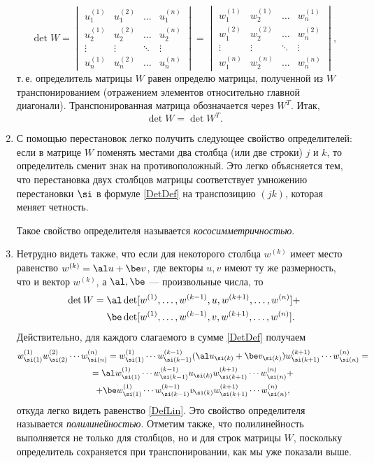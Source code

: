 \begin{enumerate}
$$\det W =
\begin{vmatrix}
u^{(1)}_1 & u^{(2)}_1 & \dots & u^{(n)}_1 \\[12pt]
u^{(1)}_2 & u^{(2)}_2 & \dots & u^{(n)}_2 \\[12pt]
\vdots & \vdots & \ddots & \vdots \\[12pt]
u^{(1)}_n & u^{(2)}_n & \dots & u^{(n)}_n
\end{vmatrix} =
\begin{vmatrix}
w^{(1)}_1 & w^{(1)}_2 & \dots & w^{(1)}_n \\[12pt]
w^{(2)}_1 & w^{(2)}_2 & \dots & w^{(2)}_n \\[12pt]
\vdots & \vdots & \ddots & \vdots \\[12pt]
w^{(n)}_1 & w^{(n)}_2 & \dots & w^{(n)}_n
\end{vmatrix},
$$
т.\,е. определитель матрицы $W$ равен определю матрицы, полученной из $W$ транспонированием (отражением элементов относительно главной диагонали). Транспонированная матрица обозначается через $W^T$. Итак,
$$
\det W=\det W^T.
$$

\item С помощью перестановок легко получить следующее свойство определителей: если в матрице $W$ поменять местами два столбца (или две строки) $j$ и $k$, то определитель сменит знак на противоположный. Это легко объясняется тем, что перестановка двух столбцов матрицы соответствует умножению перестановки $\si$ в формуле \eqref{DetDef} на транспозицию $(jk)$, которая меняет четность.

Такое свойство определителя называется \textit{кососимметричностью}.

\item Нетрудно видеть также, что если для некоторого столбца $w^{(k)}$ имеет место равенство $w^{(k)}=\al u+\be v$, где векторы $u,v$ имеют ту же размерность, что и вектор $w^{(k)}$, а $\al,\be$ --- произвольные числа, то
\begin{align}
\det W = &\; \al\det[w^{(1)},\dots,w^{(k-1)},u,w^{(k+1)},\dots,w^{(n)}]+ \nonumber\\ 
&\; \be\det[w^{(1)},\dots,w^{(k-1)},v,w^{(k+1)},\dots,w^{(n)}]. \label{DefLin}
\end{align}
Действительно, для каждого слагаемого в сумме \eqref{DetDef} получаем
\begin{multline*}
w^{(1)}_{\si(1)}w^{(2)}_{\si(2)}\cdots w^{(n)}_{\si(n)} = 
w^{(1)}_{\si(1)}\cdots w^{(k-1)}_{\si(k-1)}(\al u_{\si(k)}+\be v_{\si(k)})w^{(k+1)}_{\si(k+1)}\cdots w^{(n)}_{\si(n)} = \\
= 
\al w^{(1)}_{\si(1)}\cdots w^{(k-1)}_{\si(k-1)}u_{\si(k)}w^{(k+1)}_{\si(k+1)}\cdots w^{(n)}_{\si(n)} + \\
+\be w^{(1)}_{\si(1)}\cdots w^{(k-1)}_{\si(k-1)}v_{\si(k)}w^{(k+1)}_{\si(k+1)}\cdots w^{(n)}_{\si(n)},
\end{multline*}
откуда легко видеть равенство \eqref{DefLin}. Это свойство определителя называется \textit{полилинейностью}. Отметим также, что полилинейность выполняется не только для столбцов, но и для строк матрицы $W$, поскольку определитель сохраняется при транспонировании, как мы уже показали выше.



\end{enumerate}
